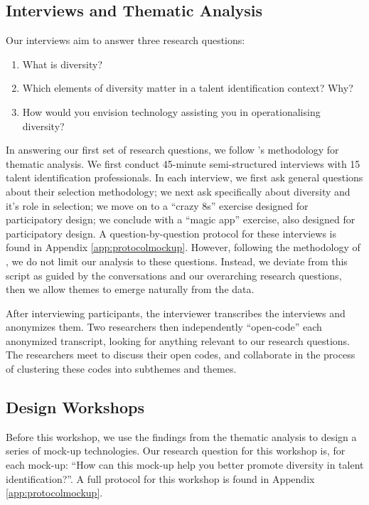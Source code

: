 \subsection{Interviews and Thematic Analysis}
Our interviews aim to answer three research questions:

\begin{enumerate}
    \item What is diversity?
    \item Which elements of diversity matter in a talent identification context? Why?
    \item How would you envision technology assisting you in operationalising diversity?
\end{enumerate}

In answering our first set of research questions, we follow \cite{braun_using_2006}'s methodology for thematic analysis. We first conduct 45-minute semi-structured interviews with 15 talent identification professionals. In each interview, we first ask general questions about their selection methodology; we next ask specifically about diversity and it's role in selection; we move on to a ``crazy 8s'' exercise designed for participatory design; we conclude with a ``magic app'' exercise, also designed for participatory design. A question-by-question protocol for these interviews is found in Appendix \ref{app:protocolmockup}. However, following the methodology of \cite{braun_using_2006}, we do not limit our analysis to these questions. Instead, we deviate from this script as guided by the conversations and our overarching research questions, then we allow themes to emerge naturally from the data.

After interviewing participants, the interviewer transcribes the interviews and anonymizes them. Two researchers then independently ``open-code'' each anonymized transcript, looking for anything relevant to our research questions. The researchers meet to discuss their open codes, and collaborate in the process of clustering these codes into subthemes and themes.

\subsection{Design Workshops}
Before this workshop, we use the findings from the thematic analysis to design a series of mock-up technologies. Our research question for this workshop is, for each mock-up: ``How can this mock-up help you better promote diversity in talent identification?''. A full protocol for this workshop is found in Appendix \ref{app:protocolmockup}.


